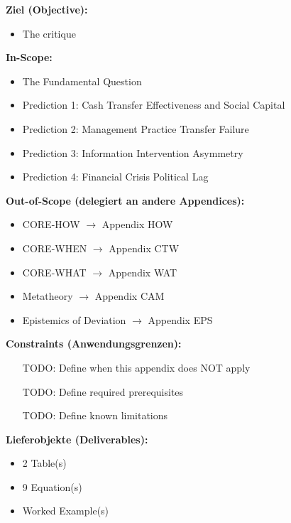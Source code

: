 
\begin{tcolorbox}[
    colback=orange!5!white,
    colframe=orange!75!black,
    title={\textbf{Appendix Scope: Ziel / In-Scope / Out-of-Scope / Constraints}},
    fonttitle=\bfseries
]

\textbf{Ziel (Objective):}
\begin{itemize}[nosep]
    \item The critique
\end{itemize}

\textbf{In-Scope:}
\begin{itemize}[nosep]
    \item The Fundamental Question
    \item Prediction 1: Cash Transfer Effectiveness and Social Capital
    \item Prediction 2: Management Practice Transfer Failure
    \item Prediction 3: Information Intervention Asymmetry
    \item Prediction 4: Financial Crisis Political Lag
\end{itemize}

\textbf{Out-of-Scope (delegiert an andere Appendices):}
\begin{itemize}[nosep]
    \item CORE-HOW $\rightarrow$ Appendix HOW
    \item CORE-WHEN $\rightarrow$ Appendix CTW
    \item CORE-WHAT $\rightarrow$ Appendix WAT
    \item Metatheory $\rightarrow$ Appendix CAM
    \item Epistemics of Deviation $\rightarrow$ Appendix EPS
\end{itemize}

\textbf{Constraints (Anwendungsgrenzen):}
\begin{itemize}[nosep]
    \item [TODO: Define when this appendix does NOT apply]
    \item [TODO: Define required prerequisites]
    \item [TODO: Define known limitations]
\end{itemize}

\textbf{Lieferobjekte (Deliverables):}
\begin{itemize}[nosep]
    \item 2 Table(s)
    \item 9 Equation(s)
    \item Worked Example(s)
\end{itemize}

\end{tcolorbox}




